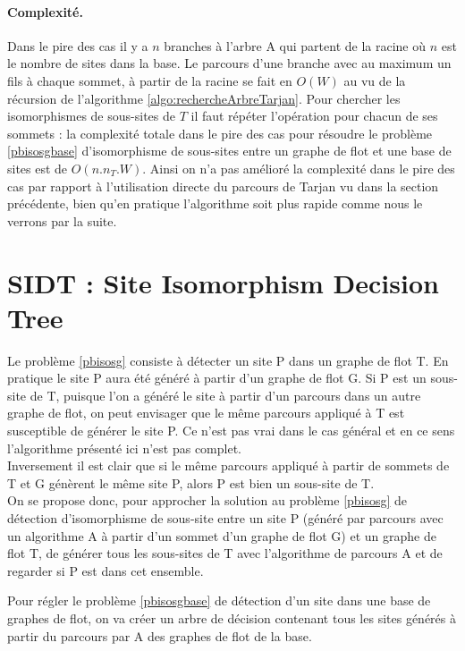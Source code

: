 \paragraph{Complexité.}
Dans le pire des cas il y a $n$ branches à l'arbre A qui partent de la racine où $n$ est le nombre de sites dans la base. Le parcours d'une branche avec au maximum un fils à chaque sommet, à partir de la racine se fait en $O(W)$ au vu de la récursion de l'algorithme \ref{algo:rechercheArbreTarjan}. Pour chercher les isomorphismes de sous-sites de $T$ il faut répéter l'opération pour chacun de ses sommets : la complexité totale dans le pire des cas pour résoudre le problème \ref{pbisosgbase} d'isomorphisme de sous-sites entre un graphe de flot et une base de sites est de $O(n.n_T.W)$. Ainsi on n'a pas amélioré la complexité dans le pire des cas par rapport à l'utilisation directe du parcours de Tarjan vu dans la section précédente, bien qu'en pratique l'algorithme soit plus rapide comme nous le verrons par la suite.

\section{SIDT : Site Isomorphism Decision Tree}
Le problème \ref{pbisosg} consiste à détecter un site P dans un graphe de flot T. En pratique le site P aura été généré à partir d'un graphe de flot G. Si P est un sous-site de T, puisque l'on a généré le site à partir d'un parcours dans un autre graphe de flot, on peut envisager que le même parcours appliqué à T est susceptible de générer le site P. Ce n'est pas vrai dans le cas général et en ce sens l'algorithme présenté ici n'est pas complet.\\
Inversement il est clair que si le même parcours appliqué à partir de sommets de T et G génèrent le même site P, alors P est bien un sous-site de T.
\\

On se propose donc, pour approcher la solution au problème \ref{pbisosg} de détection d'isomorphisme de sous-site entre un site P (généré par parcours avec un algorithme A à partir d'un sommet d'un graphe de flot G) et un graphe de flot T, de générer tous les sous-sites de T avec l'algorithme de parcours A et de regarder si P est dans cet ensemble.

Pour régler le problème \ref{pbisosgbase} de détection d'un site dans une base de graphes de flot, on va créer un arbre de décision contenant tous les sites générés à partir du parcours par A des graphes de flot de la base.

